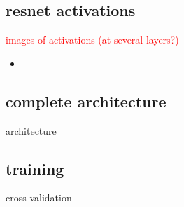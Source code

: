 \subsection{resnet activations}

\textcolor{red}{images of activations (at several layers?)}

\begin{itemize}
	\item \url{}
\end{itemize}

\subsection{complete architecture}

architecture

\subsection{training}

cross validation
